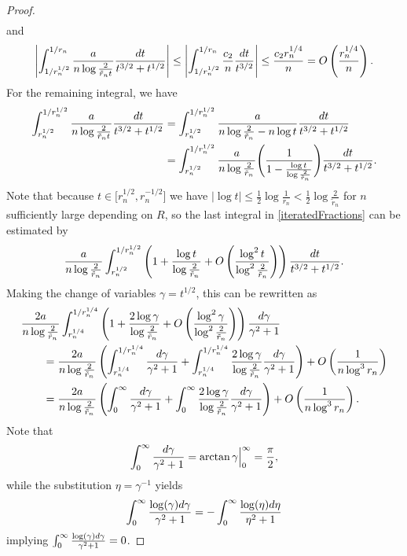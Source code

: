 \documentclass[11pt]{article}
\numberwithin{equation}{section}
\numberwithin{equation}{section}
\begin{document}
\begin{proof}
\begin{align*}
\end{align*}
and
\begin{align*}
 \left|\int_{1/r_n^{1/2}}^{1/r_n} \frac{a}{n\log \frac{2}{\tilde r_n t}} \frac{{\rm d}t}{t^{3/2}+t^{1/2}} \right| \leq \left|\int_{1/r_n^{1/2}}^{1/r_n} \frac{c_2}{n} \frac{{\rm d}t}{t^{3/2}}\right| \leq \frac{c_2 r_n^{1/4}}{n} = O\left(\frac{r_n^{1/4}}{n}\right).
\end{align*}
For the remaining integral, we have
\begin{align}\nonumber
 \int_{r_n^{1/2}}^{1/r_n^{1/2}} \frac{a}{n\log \frac{2}{\tilde r_n t}} \frac{{\rm d}t}{t^{3/2}+t^{1/2}} &=
 \int_{r_n^{1/2}}^{1/r_n^{1/2}} \frac{a}{n\log \frac{2}{\tilde r_n }-n \log t} \frac{{\rm d}t}{t^{3/2}+t^{1/2}}
 \\\label{iteratedFractions}
 &= \int_{r_n^{1/2}}^{1/r_n^{1/2}} \frac{a}{n\log \frac{2}{\tilde r_n }} \Bigg(\frac{1}{1-\frac{\log t}{\log \frac{2}{\tilde r_n}}} \Bigg) \frac{{\rm d}t}{t^{3/2}+t^{1/2}}.
\end{align}
Note that because $t \in \big[r_n^{1/2}, r_n^{-1/2}\big]$ we have $|\log t| \leq \frac{1}{2} \log{\frac{1}{r_n}} < \frac{1}{2} \log{\frac{2}{\tilde r_n}}$ for $n$ sufficiently large depending on $R$, so the last integral in \eqref{iteratedFractions} can be estimated by
\begin{align*}
 \frac{a}{n\log \frac{2}{\tilde r_n }} \int_{r_n^{1/2}}^{1/r_n^{1/2}} \left(1+\frac{\log t}{\log \frac{2}{\tilde r_n}} + O \left( \frac{\log^2 t}{\log^2 \frac{2}{\tilde r_n}} \right)\right) \frac{{\rm d}t}{t^{3/2}+t^{1/2}}.
\end{align*}
Making the change of variables $\gamma = t^{1/2}$, this can be rewritten as
\begin{align*}
 &\frac{2a}{n\log \frac{2}{\tilde r_n }} \int_{r_n^{1/4}}^{1/r_n^{1/4}} \left(1+\frac{2\log \gamma}{\log \frac{2}{\tilde r_n}} + O \left( \frac{\log^2 \gamma}{\log^2 \frac{2}{\tilde r_n}} \right)\right) \frac{{\rm d}\gamma}{\gamma^{2}+1}
 \\
 &\qquad= \frac{2a}{n\log \frac{2}{\tilde r_n }} \left(\int_{r_n^{1/4}}^{1/r_n^{1/4}} \frac{{\rm d}\gamma}{\gamma^{2}+1} + \int_{r_n^{1/4}}^{1/r_n^{1/4}} \frac{2\log \gamma}{\log \frac{2}{\tilde r_n}} \frac{{\rm d}\gamma}{\gamma^{2}+1} \right)+ O\left(\frac{1}{n \log^3 r_n}\right)
 \\
 &\qquad= \frac{2a}{n\log \frac{2}{\tilde r_n }} \left(\int_{0}^{\infty} \frac{{\rm d}\gamma}{\gamma^{2}+1} + \int_{0}^{\infty} \frac{2\log \gamma}{\log \frac{2}{\tilde r_n}} \frac{{\rm d}\gamma}{\gamma^{2}+1}\right) + O\left(\frac{1}{n \log^3 r_n}\right).
\end{align*}
Note that
\begin{align*}
 \int_{0}^{\infty} \frac{{\rm d}\gamma}{\gamma^{2}+1} = \arctan \gamma \Big|^\infty_0 = \frac{\pi}{2},
\end{align*}
while the substitution $\eta = \gamma^{-1}$ yields
\begin{align*}
 \int_{0}^{\infty} \frac{\log(\gamma){\rm d}\gamma}{\gamma^{2}+1} = - \int_{0}^{\infty} \frac{\log(\eta){\rm d}\eta}{\eta^{2}+1}
\end{align*}
implying $\int_{0}^{\infty} \frac{\log(\gamma){\rm d}\gamma}{\gamma^{2}+1} = 0$.


\end{proof}
\end{document}
